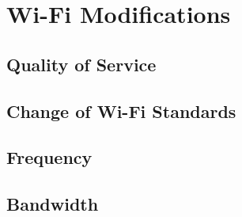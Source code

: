 \chapter{Wi-Fi Modifications}
\section{Quality of Service}
\section{Change of Wi-Fi Standards}
\section{Frequency}
\section{Bandwidth}
